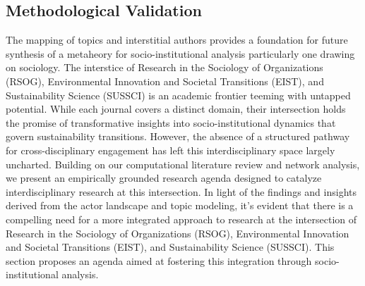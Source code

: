 \documentclass[12pt]{article}
\begin{document}
\subsection{Methodological Validation}

The mapping of topics and interstitial authors provides a foundation for future synthesis of a metaheory for socio-institutional analysis particularly one drawing on sociology\cite{Loorbach2017}. The interstice of Research in the Sociology of Organizations (RSOG), Environmental Innovation and Societal Transitions (EIST), and Sustainability Science (SUSSCI) is an academic frontier teeming with untapped potential. While each journal covers a distinct domain, their intersection holds the promise of transformative insights into socio-institutional dynamics that govern sustainability transitions. However, the absence of a structured pathway for cross-disciplinary engagement has left this interdisciplinary space largely uncharted. Building on our computational literature review and network analysis, we present an empirically grounded research agenda designed to catalyze interdisciplinary research at this intersection. In light of the findings and insights derived from the actor landscape and topic modeling, it's evident that there is a compelling need for a more integrated approach to research at the intersection of Research in the Sociology of Organizations (RSOG), Environmental Innovation and Societal Transitions (EIST), and Sustainability Science (SUSSCI). This section proposes an agenda aimed at fostering this integration through socio-institutional analysis.
\end{document}
